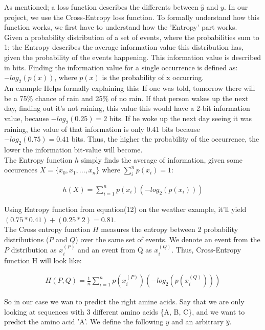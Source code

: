 As mentioned; a loss function describes the differents between $\hat{y}$ and $y$. In our project, we use the Cross-Entropy loss function. To formally understand how this function works, we first have to understand how the 'Entropy' part works. \\

\noindent
Given a probability distribution of a set of events, where the probabilities sum to 1; the Entropy describes the average information value this distribution has, given the probability of the events happening. This information value is described in bits. Finding the information value for a single occurrence is defined as: $-log_2(p(x))$, where $p(x)$ is the probability of x occurring.\\

\noindent
An example Helps formally explaining this: If one was told, tomorrow there will be a 75\% chance of rain and 25\% of no rain. If that person wakes up the next day, finding out it's not raining, this value this would have a 2-bit information value, because $-log_2(0.25) = 2$ bits. If he woke up the next day seeing it was raining, the value of that information is only 0.41 bits because $-log_2(0.75) = 0.41$ bits. Thus, the higher the probability of the occurrence, the lower the information bit-value will become. \\

\noindent
The Entropy function $h$ simply finds the average of information, given some occurences $X=\{x_0,x_1,...,x_n\}$ where $\sum^n_{i} p(x_i) = 1$:

\begin{align}
    h(X) = \sum^n_{i=1} p(x_i)(-log_2(p(x_i)))
\end{align}

\noindent
Using Entropy function from equation(12) on the weather example, it'll yield $(0.75 * 0.41) + (0.25 * 2) = 0.81$.\\

\noindent
The Cross entropy function $H$ measures the entropy between 2 probability distributions ($P$ and $Q$) over the same set of events. We denote an event from the $P$ distribution as $x_i^{(P)}$ and an event from Q as $x_i^{(Q)}$. Thus, Cross-Entropy function H will look like:

\begin{align}
    H(P,Q) = \frac{1}{n} \sum^n_{i=1} p(x_i^{(P)})(-log_2(p(x_i^{(Q)})))
\end{align}

\noindent
So in our case we wan to predict the right amine acids. Say that we are only looking at sequences with 3 different amino acids \{A, B, C\}, and we want to predict the amino acid 'A'. We define the following $y$ and an arbitrary $\hat{y}$.

